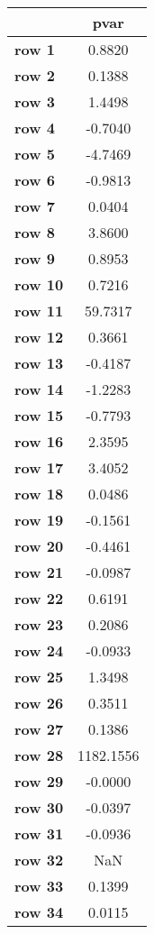 \begin{tiny}\begin{tabular}{|l|c|}
\hline
&\textbf{pvar}\\\hline
\textbf{row 1}&0.8820\\\hline
\textbf{row 2}&0.1388\\\hline
\textbf{row 3}&1.4498\\\hline
\textbf{row 4}&-0.7040\\\hline
\textbf{row 5}&-4.7469\\\hline
\textbf{row 6}&-0.9813\\\hline
\textbf{row 7}&0.0404\\\hline
\textbf{row 8}&3.8600\\\hline
\textbf{row 9}&0.8953\\\hline
\textbf{row 10}&0.7216\\\hline
\textbf{row 11}&59.7317\\\hline
\textbf{row 12}&0.3661\\\hline
\textbf{row 13}&-0.4187\\\hline
\textbf{row 14}&-1.2283\\\hline
\textbf{row 15}&-0.7793\\\hline
\textbf{row 16}&2.3595\\\hline
\textbf{row 17}&3.4052\\\hline
\textbf{row 18}&0.0486\\\hline
\textbf{row 19}&-0.1561\\\hline
\textbf{row 20}&-0.4461\\\hline
\textbf{row 21}&-0.0987\\\hline
\textbf{row 22}&0.6191\\\hline
\textbf{row 23}&0.2086\\\hline
\textbf{row 24}&-0.0933\\\hline
\textbf{row 25}&1.3498\\\hline
\textbf{row 26}&0.3511\\\hline
\textbf{row 27}&0.1386\\\hline
\textbf{row 28}&1182.1556\\\hline
\textbf{row 29}&-0.0000\\\hline
\textbf{row 30}&-0.0397\\\hline
\textbf{row 31}&-0.0936\\\hline
\textbf{row 32}&NaN\\\hline
\textbf{row 33}&0.1399\\\hline
\textbf{row 34}&0.0115\\\hline

\end{tabular}
\end{tiny}
